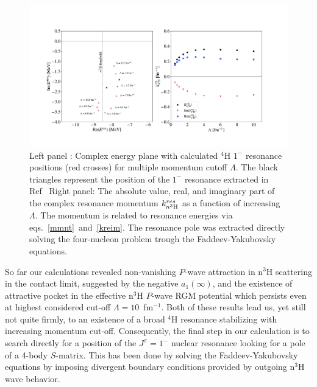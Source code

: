 \documentclass[5p,times]{elsarticle}
\begin{document}
\begin{figure}
\centering
  \includegraphics[width=.98\linewidth]{Graphs/resonance.pdf}
  \caption{ Left panel : Complex energy plane with calculated $^4$H $1^-$ resonance positions (red crosses) for multiple momentum cutoff $\Lambda$. 
  The black triangles represent the position of the $1^-$ resonance extracted in Ref~\cite{Lazauskas:2019cxj}
  Right panel: The absolute value, real, and imaginary part of the complex resonance momentum $k^{res}_{n ^3{\rm H}}$ as a function of increasing $\Lambda$. The momentum is related to resonance energies via eqs.~\ref{mmnt}~and~\ref{kreim}. The resonance pole was extracted directly solving the four-nucleon problem trough the Faddeev-Yakubovsky equations.}
  \label{fig:Pole_PositionN}
\end{figure}

%
So far our calculations revealed non-vanishing $P$-wave attraction in n$^3$H scattering in the contact limit, suggested by the negative $a_1(\infty)$, and the existence of attractive pocket in the effective n$^3$H $P$-wave RGM potential which persists even at highest considered cut-off $\Lambda=10$~fm$^{-1}$. Both of these results lead us, yet still not quite firmly, to an existence of a broad $^4$H resonance stabilizing with increasing momentum cut-off. Consequently, the final step in our calculation is to search directly for a position of the $J^\pi=1^-$ nuclear resonance looking for a pole of a 4-body $S$-matrix. This has been done by solving the Faddeev-Yakubovsky equations by imposing divergent boundary conditions provided by outgoing n$^3$H wave behavior.
\end{document}
